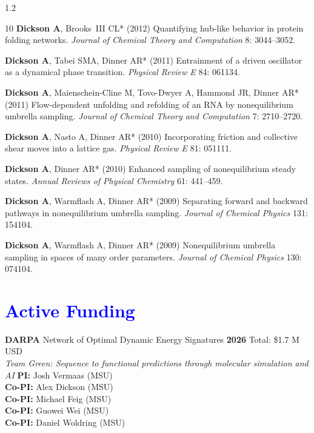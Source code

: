 \documentclass[margin,line]{res}
\begin{document}
\begin{resume}
\begin{spacing}{1.2}
\begin{thebibliography}{10}
{\bf Dickson A}, Brooks~{III} CL* (2012) Quantifying hub-like behavior in protein
  folding networks.
\newblock \textit{Journal of Chemical Theory and Computation} 8: 3044--3052.

{\bf Dickson A}, Tabei SMA, Dinner AR* (2011) {Entrainment of a driven oscillator as a
  dynamical phase transition}.
\newblock \textit{Physical Review E} 84: 061134.

{\bf Dickson A}, Maienschein-Cline M, Tovo-Dwyer A, Hammond JR, Dinner AR* (2011)
  Flow-dependent unfolding and refolding of an {RNA} by nonequilibrium umbrella
  sampling.
\newblock \textit{Journal of Chemical Theory and Computation} 7: 2710--2720.

{\bf Dickson A}, Nasto A, Dinner AR* (2010) {Incorporating friction and collective
  shear moves into a lattice gas.}
\newblock \textit{Physical Review E} 81: 051111.

{\bf Dickson A}, Dinner AR* (2010) Enhanced sampling of nonequilibrium steady states.
\newblock \textit{Annual Reviews of Physical Chemistry} 61: 441--459.

{\bf Dickson A}, Warmflash A, Dinner AR* (2009) Separating forward and backward
  pathways in nonequilibrium umbrella sampling.
\newblock \textit{Journal of Chemical Physics} 131: 154104.

{\bf Dickson A}, Warmflash A, Dinner AR* (2009) Nonequilibrium umbrella sampling in
  spaces of many order parameters.
\newblock \textit{Journal of Chemical Physics} 130: 074104.

\end{thebibliography}
\end{spacing}
\endgroup

\section{\sc \textcolor{blue}{Active Funding} }

{\bf DARPA} Network of Optimal Dynamic Energy Signatures \hfill {\bf 2026} Total: \$1.7 M USD \\
\emph{Team Green: Sequence to functional predictions through molecular simulation and AI}
{\bf PI:} Josh Vermaas (MSU)\\
{\bf Co-PI:} Alex Dickson (MSU)\\
{\bf Co-PI:} Michael Feig (MSU)\\
{\bf Co-PI:} Guowei Wei (MSU)\\
{\bf Co-PI:} Daniel Woldring (MSU)


\end{resume}
\end{document}
